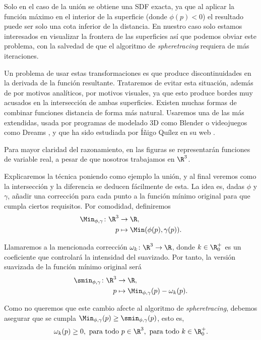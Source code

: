 Solo en el caso de la unión se obtiene una SDF exacta, ya que al aplicar la función máximo en el interior de la superficie (donde $\phi(p) < 0$) el resultado puede ser solo una cota inferior de la distancia. En nuestro caso solo estamos interesados en visualizar la frontera de las superficies así que podemos obviar este problema, con la salvedad de que el algoritmo de \textit{spheretracing} requiera de más iteraciones.

Un problema de usar estas transformaciones es que produce discontinuidades en la derivada de la función resultante. Trataremos de evitar esta situación, además de por motivos analíticos, por motivos visuales, ya que esto produce bordes muy acusados en la intersección de ambas superficies. Existen muchas formas de combinar funciones distancia de forma más natural. Usaremos una de las más extendidas, usada por programas de modelado 3D como Blender \cite{repo:blender} o videojuegos como Dreams \cite{game:dreams}, y que ha sido estudiada por Íñigo Quílez en su web \cite{article:smooth}.

\begin{observacion}
    Para mayor claridad del razonamiento, en las figuras se representarán funciones de variable real, a pesar de que nosotros trabajamos en $\R^3$.
\end{observacion}

Explicaremos la técnica poniendo como ejemplo la unión, y al final veremos como la intersección y la diferencia se deducen fácilmente de esta. La idea es, dadas $\phi$ y $\gamma$, añadir una corrección para cada punto a la función mínimo original para que cumpla ciertos requisitos. Por comodidad, definiremos 
\begin{align*}
      \Min_{\phi,\gamma}\colon \R^3 &\to \R,\\
      p &\mapsto \Min(\phi(p),\gamma(p)).
\end{align*}

Llamaremos a la mencionada corrección $\omega_k\colon \R^3\to\R$, donde $k\in \R_0^+$ es un coeficiente que controlará la intensidad del suavizado. Por tanto, la versión suavizada de la función mínimo original será
\begin{align*}
      \smin_{\phi,\gamma}\colon \R^3 &\to \R,\\
      p &\mapsto \Min_{\phi,\gamma}(p) - \omega_k(p).
\end{align*}

Como no queremos que este cambio afecte al algoritmo de \textit{spheretracing}, debemos asegurar que se cumpla $\Min_{\phi,\gamma}(p)\ge \smin_{\phi,\gamma}(p)$, esto es,
\begin{equation*}
\omega_k(p)\ge 0,\ \text{para todo } p\in \R^3,\ \text{para todo } k\in \R^+_0.
\end{equation*}

